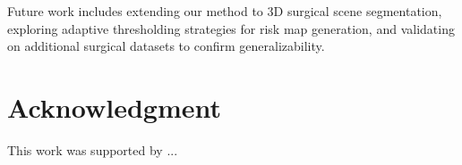 \documentclass[conference]{IEEEtran}
\begin{document}
Future work includes extending our method to 3D surgical scene segmentation, exploring adaptive thresholding strategies for risk map generation, and validating on additional surgical datasets to confirm generalizability.

\section*{Acknowledgment}
This work was supported by ...



\end{document}

